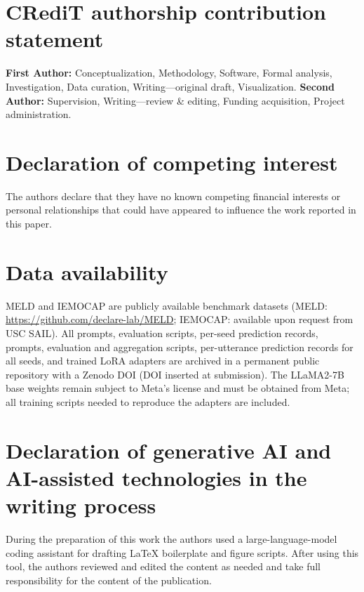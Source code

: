 
\section*{CRediT authorship contribution statement}
\textbf{First Author:} Conceptualization, Methodology, Software, Formal
analysis, Investigation, Data curation, Writing---original draft,
Visualization.
\textbf{Second Author:} Supervision, Writing---review \& editing, Funding
acquisition, Project administration.

\section*{Declaration of competing interest}
The authors declare that they have no known competing financial interests or
personal relationships that could have appeared to influence the work
reported in this paper.

\section*{Data availability}
MELD and IEMOCAP are publicly available benchmark datasets (MELD:
\url{https://github.com/declare-lab/MELD}; IEMOCAP: available upon request
from USC SAIL). All prompts, evaluation scripts, per-seed prediction records,
prompts, evaluation and aggregation scripts, per-utterance prediction
records for all seeds, and trained LoRA adapters are archived in a permanent
public repository with a Zenodo DOI (DOI inserted at submission). The LLaMA2-7B
base weights remain subject to Meta's license and must be obtained from Meta;
all training scripts needed to reproduce the adapters are included.

\section*{Declaration of generative AI and AI-assisted technologies in the
writing process}
During the preparation of this work the authors used a large-language-model
coding assistant for drafting LaTeX boilerplate and figure scripts. After
using this tool, the authors reviewed and edited the content as needed and
take full responsibility for the content of the publication.
